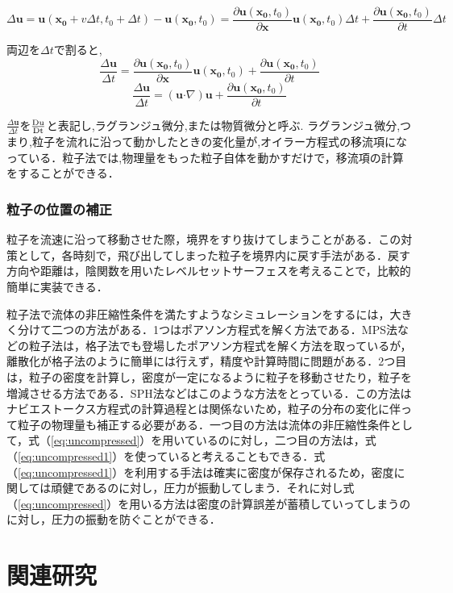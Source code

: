 \documentclass[a4j,12pt]{jreport}
\begin{document}
$$ \Delta \bm{u} = \bm{u}(\bm{x_0}+v\Delta t,t_0+\Delta t) - \bm{u}(\bm{x_0},t_0) = \frac{\partial \bm{u}(\bm{x_0},t_0)}{\partial \bm{x}}\bm{u}(\bm{x_0},t_0)\Delta t + \frac{\partial \bm{u}(\bm{x_0},t_0)}{\partial t}\Delta t$$

両辺を$\Delta t$で割ると,
$$ \frac{\Delta \bm{u}}{\Delta t} = \frac{\partial \bm{u}(\bm{x_0},t_0)}{\partial \bm{x}}\bm{u}(\bm{x_0},t_0) + \frac{\partial \bm{u}(\bm{x_0},t_0)}{\partial t}$$
$$ \frac{\Delta \bm{u}}{\Delta t} = (\bm{u}\boldsymbol{\cdot}\nabla)\bm{u} + \frac{\partial \bm{u}(\bm{x_0},t_0)}{\partial t}$$

$\frac{\Delta \bm{u}}{\Delta t}$を$\frac{\rm{D}\bm{u}}{\rm{D}t}$と表記し,ラグランジュ微分,または物質微分と呼ぶ.
ラグランジュ微分,つまり,粒子を流れに沿って動かしたときの変化量が,オイラー方程式の移流項になっている．粒子法では,物理量をもった粒子自体を動かすだけで，移流項の計算をすることができる．

\subsubsection{粒子の位置の補正} \label{subsec:fixparticlepos}
粒子を流速に沿って移動させた際，境界をすり抜けてしまうことがある．この対策として，各時刻で，飛び出してしまった粒子を境界内に戻す手法がある．戻す方向や距離は，陰関数を用いたレベルセットサーフェスを考えることで，比較的簡単に実装できる．

粒子法で流体の非圧縮性条件を満たすようなシミュレーションをするには，大きく分けて二つの方法がある．1つはポアソン方程式を解く方法である．MPS法などの粒子法は，格子法でも登場したポアソン方程式を解く方法を取っているが，離散化が格子法のように簡単には行えず，精度や計算時間に問題がある．2つ目は，粒子の密度を計算し，密度が一定になるように粒子を移動させたり，粒子を増減させる方法である．SPH法などはこのような方法をとっている．この方法はナビエストークス方程式の計算過程とは関係ないため，粒子の分布の変化に伴って粒子の物理量も補正する必要がある．一つ目の方法は流体の非圧縮性条件として，式（\ref{eq:uncompressed}）を用いているのに対し，二つ目の方法は，式（\ref{eq:uncompressed1}）を使っていると考えることもできる．式（\ref{eq:uncompressed1}）を利用する手法は確実に密度が保存されるため，密度に関しては頑健であるのに対し，圧力が振動してしまう．それに対し式（\ref{eq:uncompressed}）を用いる方法は密度の計算誤差が蓄積していってしまうのに対し，圧力の振動を防ぐことができる．

\section{関連研究} \label{sec:reratedworks}
\end{document}
